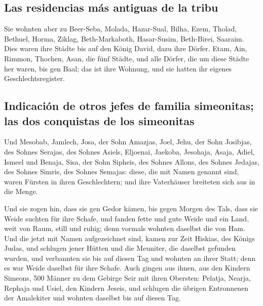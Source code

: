 \hypertarget{las-residencias-muxe1s-antiguas-de-la-tribu}{%
\subsection{Las residencias más antiguas de la
tribu}\label{las-residencias-muxe1s-antiguas-de-la-tribu}}

 Sie wohnten aber zu Beer-Seba, Molada, Hazar-Sual,
 Bilha, Ezem, Tholad,  Bethuel, Horma,
Ziklag,  Beth-Markaboth, Hasar-Susim, Beth-Birei,
Saaraim. Dies waren ihre Städte bis auf den König David, dazu ihre
Dörfer.  Etam, Ain, Rimmon, Thochen, Asan, die fünf
Städte,  und alle Dörfer, die um diese Städte her waren,
bis gen Baal; das ist ihre Wohnung, und sie hatten ihr eigenes
Geschlechtsregister.

\hypertarget{indicaciuxf3n-de-otros-jefes-de-familia-simeonitas-las-dos-conquistas-de-los-simeonitas}{%
\subsection{Indicación de otros jefes de familia simeonitas; las dos
conquistas de los
simeonitas}\label{indicaciuxf3n-de-otros-jefes-de-familia-simeonitas-las-dos-conquistas-de-los-simeonitas}}

 Und Mesobab, Jamlech, Josa, der Sohn Amazjas,
 Joel, Jehu, der Sohn Josibjas, des Sohnes Serajas, des
Sohnes Asiels,  Eljoenai, Jaekoba, Jesohaja, Asaja,
Adiel, Ismeel und Benaja,  Sisa, der Sohn Sipheis, des
Sohnes Allons, des Sohnes Jedajas, des Sohnes Simris, des Sohnes
Semajas:  diese, die mit Namen genannt sind, waren
Fürsten in ihren Geschlechtern; und ihre Vaterhäuser breiteten sich aus
in die Menge.

 Und sie zogen hin, dass sie gen Gedor kämen, bis gegen
Morgen des Tals, dass sie Weide suchten für ihre Schafe, 
und fanden fette und gute Weide und ein Land, weit von Raum, still und
ruhig; denn vormals wohnten daselbst die von Ham.  Und
die jetzt mit Namen aufgezeichnet sind, kamen zur Zeit Hiskias, des
Königs Judas, und schlugen jener Hütten und die Meuniter, die daselbst
gefunden wurden, und verbannten sie bis auf diesen Tag und wohnten an
ihrer Statt; denn es war Weide daselbst für ihre Schafe. 
Auch gingen aus ihnen, aus den Kindern Simeons, 500 Männer zu dem
Gebirge Seir mit ihren Obersten: Pelatja, Nearja, Rephaja und Usiel, den
Kindern Jeseis,  und schlugen die übrigen Entronnenen der
Amalekiter und wohnten daselbst bis auf diesen Tag.

